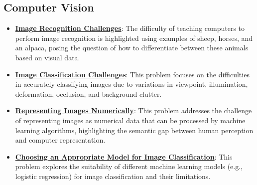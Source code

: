 \documentclass{article}%
\begin{document}
\subsection{Computer Vision}%
\label{subsec:ComputerVision}%
\begin{itemize}[leftmargin=*]%
\item \href{https://purdue.brightspace.com/d2l/common/assets/pdfjs-d2l-dist/1.0.14-legacy/web/viewer.html?file=\%2Fcontent\%2Fenforced\%2F1095467-wl.202510.CS.24300.001\%2F05L2-ML Basics.pdf\%3Fou\%3D1095467\&lang=en-us\&container=d2l-fileviewer-rendered-pdf\&fullscreen=d2l-fileviewer-rendered-pdf-dialog\&height=667#page=4}{\textbf{Image Recognition Challenges}}: The difficulty of teaching computers to perform image recognition is highlighted using examples of sheep, horses, and an alpaca, posing the question of how to differentiate between these animals based on visual data.%
\item \href{https://purdue.brightspace.com/d2l/common/assets/pdfjs-d2l-dist/1.0.14-legacy/web/viewer.html?file=\%2Fcontent\%2Fenforced\%2F1095467-wl.202510.CS.24300.001\%2F07L2-Vision.pdf\%3Fou\%3D1095467\&lang=en-us\&container=d2l-fileviewer-rendered-pdf\&fullscreen=d2l-fileviewer-rendered-pdf-dialog\&height=667#page=4}{\textbf{Image Classification Challenges}}: This problem focuses on the difficulties in accurately classifying images due to variations in viewpoint, illumination, deformation, occlusion, and background clutter.%
\item \href{https://purdue.brightspace.com/d2l/common/assets/pdfjs-d2l-dist/1.0.14-legacy/web/viewer.html?file=\%2Fcontent\%2Fenforced\%2F1095467-wl.202510.CS.24300.001\%2F07L2-Vision.pdf\%3Fou\%3D1095467\&lang=en-us\&container=d2l-fileviewer-rendered-pdf\&fullscreen=d2l-fileviewer-rendered-pdf-dialog\&height=667#page=4}{\textbf{Representing Images Numerically}}: This problem addresses the challenge of representing images as numerical data that can be processed by machine learning algorithms, highlighting the semantic gap between human perception and computer representation.%
\item \href{https://purdue.brightspace.com/d2l/common/assets/pdfjs-d2l-dist/1.0.14-legacy/web/viewer.html?file=\%2Fcontent\%2Fenforced\%2F1095467-wl.202510.CS.24300.001\%2F07L2-Vision.pdf\%3Fou\%3D1095467\&lang=en-us\&container=d2l-fileviewer-rendered-pdf\&fullscreen=d2l-fileviewer-rendered-pdf-dialog\&height=667#page=5}{\textbf{Choosing an Appropriate Model for Image Classification}}: This problem explores the suitability of different machine learning models (e.g., logistic regression) for image classification and their limitations.%

\end{itemize}
\end{document}

